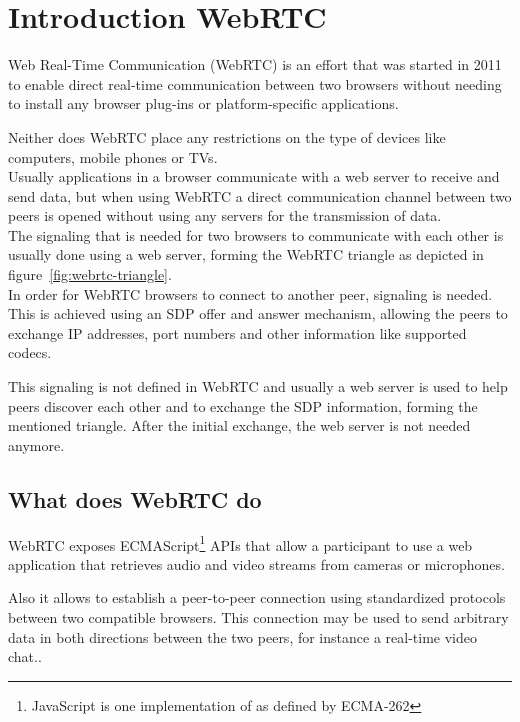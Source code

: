 \documentclass[../../../thesis.tex]{subfiles}
\begin{document}
\section{Introduction WebRTC}
Web Real-Time Communication (WebRTC) is an effort that was started in 2011\cite{Manson.2013} to enable direct real-time communication between two browsers without needing to install any browser plug-ins or platform-specific applications.\par
Neither does WebRTC place any restrictions on the type of devices like computers, mobile phones or TVs.
\\

Usually applications in a browser communicate with a web server to receive and send data, but when using WebRTC a direct communication channel between two peers is opened without using any servers for the transmission of data.\\
The signaling that is needed for two browsers to communicate with each other is usually done using a web server, forming the WebRTC triangle as depicted in figure~\ref{fig:webrtc-triangle}.\\

In order for WebRTC browsers to connect to another peer, signaling is needed. This is achieved using an SDP offer and answer mechanism, allowing the peers to exchange IP addresses, port numbers and other information like supported codecs.\par
This signaling is not defined in WebRTC and usually a web server is used to help peers discover each other and to exchange the SDP information, forming the mentioned triangle. After the initial exchange, the web server is not needed anymore.\\

\subsection{What does WebRTC do}
WebRTC exposes ECMAScript\footnote{JavaScript is one implementation of \cite{ECMAScript} as defined by ECMA-262} APIs that allow a participant to use a web application that retrieves audio and video streams from cameras or microphones.\par
Also it allows to establish a peer-to-peer connection using standardized protocols between two compatible browsers. This connection may be used to send arbitrary data in both directions between the two peers, for instance a real-time video chat..
\end{document}
